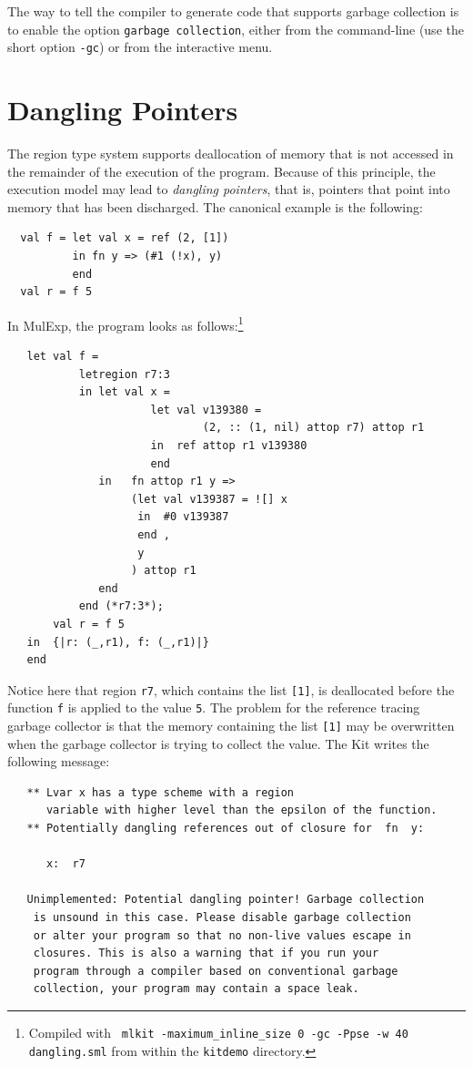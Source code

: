 \documentclass[12pt]{book}
\begin{document}
The way to tell the compiler to generate code that supports garbage
collection is to enable the option {\tt garbage collection}, either
from the command-line (use the short option {\tt -gc}) or from the
interactive menu.

\section{Dangling Pointers}
The region type system supports deallocation of memory that is not
accessed in the remainder of the execution of the program. Because of
this principle, the execution model may lead to {\em dangling
  pointers}, that is, pointers that point into memory that has been
discharged. The canonical example is the following:
\begin{verbatim}
  val f = let val x = ref (2, [1])
          in fn y => (#1 (!x), y)
          end 
  val r = f 5
\end{verbatim}
In MulExp, the program looks as follows:\footnote{Compiled with {\tt
    mlkit -maximum\_inline\_size 0 -gc -Ppse -w 40 dangling.sml} from
  within the {\tt kitdemo} directory.}
\begin{verbatim}
   let val f = 
           letregion r7:3 
           in let val x = 
                      let val v139380 = 
                              (2, :: (1, nil) attop r7) attop r1
                      in  ref attop r1 v139380
                      end 
              in   fn attop r1 y => 
                   (let val v139387 = ![] x
                    in  #0 v139387
                    end , 
                    y
                   ) attop r1
              end  
           end (*r7:3*); 
       val r = f 5
   in  {|r: (_,r1), f: (_,r1)|}
   end 
\end{verbatim}
Notice here that region {\tt r7}, which contains the list {\tt [1]},
is deallocated before the function {\tt f} is applied to the value
{\tt 5}. The problem for the reference tracing garbage collector is
that the memory containing the list {\tt [1]} may be overwritten when
the garbage collector is trying to collect the value. The Kit writes
the following message:
{\small 
\begin{verbatim}
   ** Lvar x has a type scheme with a region 
      variable with higher level than the epsilon of the function.
   ** Potentially dangling references out of closure for  fn  y:

      x:  r7

   Unimplemented: Potential dangling pointer! Garbage collection 
    is unsound in this case. Please disable garbage collection
    or alter your program so that no non-live values escape in
    closures. This is also a warning that if you run your
    program through a compiler based on conventional garbage
    collection, your program may contain a space leak.
\end{verbatim}}
\end{document}
